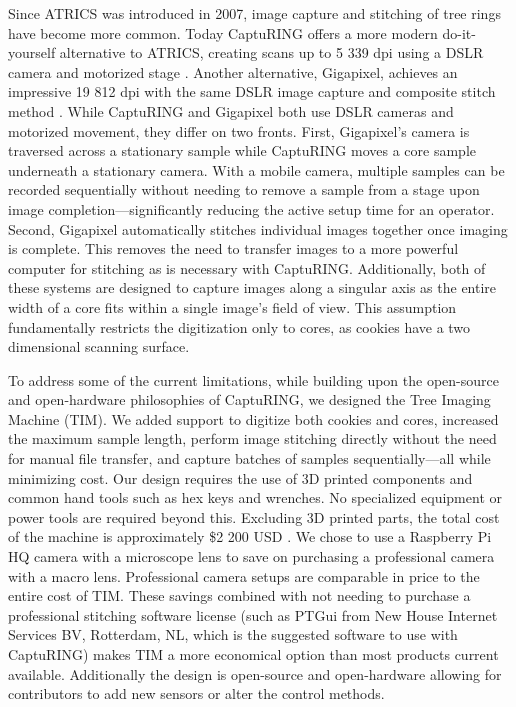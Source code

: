 \documentclass[a4paper,12pt]{article}
\begin{document}
Since ATRICS was introduced in 2007, image capture and stitching of tree rings have become more common. Today CaptuRING offers a more modern do-it-yourself alternative to ATRICS, creating scans up to 5 339 dpi using a DSLR camera and motorized stage \citep{garcia-hidalgo_capturing_2022}. 
Another alternative, Gigapixel, achieves an impressive 19 812 dpi with the same DSLR image capture and composite stitch method \citep{griffin_gigapixel_2021}. 
While CaptuRING and Gigapixel both use DSLR cameras and motorized movement, they differ on two fronts. 
First, Gigapixel's camera is traversed across a stationary sample while CaptuRING moves a core sample underneath a stationary camera.
With a mobile camera, multiple samples can be recorded sequentially without needing to remove a sample from a stage upon image completion---significantly reducing the active setup time for an operator. 
Second, Gigapixel automatically stitches individual images together once imaging is complete. This removes the need to transfer images to a more powerful computer for stitching as is necessary with CaptuRING.
Additionally, both of these systems are designed to capture images along a singular axis as the entire width of a core fits within a single image's field of view.
This assumption fundamentally restricts the digitization only to cores, as cookies have a two dimensional scanning surface. %

To address some of the current limitations, while building upon the open-source and open-hardware philosophies of CaptuRING, we designed the Tree Imaging Machine (TIM).
We added support to digitize both cookies and cores, increased the maximum sample length, perform image stitching directly without the need for manual file transfer, and capture batches of samples sequentially---all while minimizing cost.
Our design requires the use of 3D printed components and common hand tools such as hex keys and wrenches. No specialized equipment or power tools are required beyond this. 
Excluding 3D printed parts, the total cost of the machine is approximately \$2 200 USD \citep[compared to the \$70 000 USD of the Gigapixel,][]{griffin_gigapixel_2021}.
We chose to use a Raspberry Pi HQ camera with a microscope lens to save on purchasing a professional camera with a macro lens. Professional camera setups are comparable in price to the entire cost of TIM.
These savings combined with not needing to purchase a professional stitching software license (such as PTGui from New House Internet Services BV, Rotterdam, NL, which is the suggested software to use with CaptuRING) makes TIM a more economical option than most products current available. Additionally the design is open-source and open-hardware allowing for contributors to add new sensors or alter the control methods. 
\end{document}
